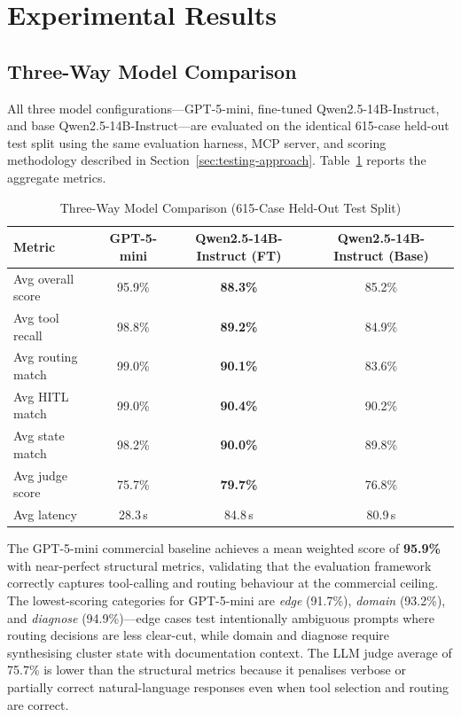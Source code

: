 \section{Experimental Results}
\label{sec:results}

\subsection{Three-Way Model Comparison}
\label{sec:ft-comparison}

All three model configurations---GPT-5-mini, fine-tuned Qwen2.5-14B-Instruct, and base Qwen2.5-14B-Instruct---are evaluated on the identical 615-case held-out test split using the same evaluation harness, MCP server, and scoring methodology described in Section~\ref{sec:testing-approach}. Table~\ref{tab:ft-vs-baseline} reports the aggregate metrics.

\begin{table}[H]
    \centering
    \caption{Three-Way Model Comparison (615-Case Held-Out Test Split)}
    \label{tab:ft-vs-baseline}
    \begin{tabular}{|l|c|c|c|}
        \hline
        \textbf{Metric} & \textbf{GPT-5-mini} & \textbf{Qwen2.5-14B-Instruct (FT)} & \textbf{Qwen2.5-14B-Instruct (Base)} \\
        \hline
        Avg overall score & 95.9\% & \textbf{88.3\%} & 85.2\% \\
        Avg tool recall   & 98.8\% & \textbf{89.2\%} & 84.9\% \\
        Avg routing match & 99.0\% & \textbf{90.1\%} & 83.6\% \\
        Avg HITL match    & 99.0\% & \textbf{90.4\%} & 90.2\% \\
        Avg state match   & 98.2\% & \textbf{90.0\%} & 89.8\% \\
        Avg judge score   & 75.7\% & \textbf{79.7\%} & 76.8\% \\
        Avg latency       & 28.3\,s & 84.8\,s        & 80.9\,s \\
        \hline
    \end{tabular}
\end{table}

The GPT-5-mini commercial baseline achieves a mean weighted score of \textbf{95.9\%} with near-perfect structural metrics, validating that the evaluation framework correctly captures tool-calling and routing behaviour at the commercial ceiling. The lowest-scoring categories for GPT-5-mini are \textit{edge} (91.7\%), \textit{domain} (93.2\%), and \textit{diagnose} (94.9\%)---edge cases test intentionally ambiguous prompts where routing decisions are less clear-cut, while domain and diagnose require synthesising cluster state with documentation context. The LLM judge average of 75.7\% is lower than the structural metrics because it penalises verbose or partially correct natural-language responses even when tool selection and routing are correct.

